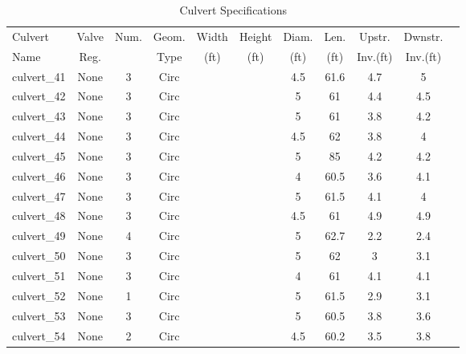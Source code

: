 \begin{table}[]
\caption{Culvert Specifications}
\label{tab:culv-specs1}
\begin{tabular}{@{}lcccccccccc@{}}
\toprule
Culvert       & Valve      & Num.     & Geom.& Width  & Height & Diam.    & Len.   & Upstr.    & Dwnstr.    \\
Name          & Reg.       &          & Type & (ft)   & (ft)   & (ft)     & (ft)   & Inv.(ft)  & Inv.(ft)   \\
\midrule
culvert\_41   & None       & 3        & Circ &        &       & 4.5      & 61.6   & 4.7       & 5          \\
culvert\_42   & None       & 3        & Circ &        &       & 5        & 61     & 4.4       & 4.5        \\
culvert\_43   & None       & 3        & Circ &        &       & 5        & 61     & 3.8       & 4.2        \\
culvert\_44   & None       & 3        & Circ &        &       & 4.5      & 62     & 3.8       & 4          \\
culvert\_45   & None       & 3        & Circ &        &       & 5        & 85     & 4.2       & 4.2        \\
culvert\_46   & None       & 3        & Circ &        &       & 4        & 60.5   & 3.6       & 4.1        \\
culvert\_47   & None       & 3        & Circ &        &       & 5        & 61.5   & 4.1       & 4          \\
culvert\_48   & None       & 3        & Circ &        &       & 4.5      & 61     & 4.9       & 4.9        \\
culvert\_49   & None       & 4        & Circ &        &       & 5        & 62.7   & 2.2       & 2.4        \\
culvert\_50   & None       & 3        & Circ &        &       & 5        & 62     & 3         & 3.1        \\
culvert\_51   & None       & 3        & Circ &        &       & 4        & 61     & 4.1       & 4.1        \\
culvert\_52   & None       & 1        & Circ &        &       & 5        & 61.5   & 2.9       & 3.1        \\
culvert\_53   & None       & 3        & Circ &        &       & 5        & 60.5   & 3.8       & 3.6        \\
culvert\_54   & None       & 2        & Circ &        &       & 4.5      & 60.2   & 3.5       & 3.8        \\

\end{tabular}
\end{table}
